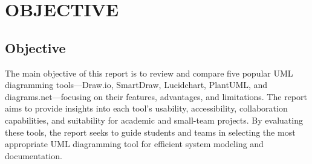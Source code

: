 \chapter{OBJECTIVE}\label{obj}

\section{Objective}

The main objective of this report is to review and compare five popular UML diagramming tools—Draw.io, SmartDraw, Lucidchart, PlantUML, and diagrams.net—focusing on their features, advantages, and limitations. The report aims to provide insights into each tool’s usability, accessibility, collaboration capabilities, and suitability for academic and small-team projects. By evaluating these tools, the report seeks to guide students and teams in selecting the most appropriate UML diagramming tool for efficient system modeling and documentation.







